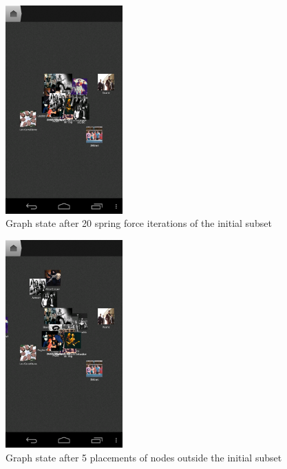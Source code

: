 \begin{figure}[H]
  \centering
    \includegraphics[width=0.4\textwidth]{figures/screen_mds_3_after_20_subset_iterations}
  \caption{Graph state after 20 spring force iterations of the initial subset}
\end{figure}

\begin{figure}[H]
  \centering
    \includegraphics[width=0.4\textwidth]{figures/screen_mds_4_after_5_restnode_additions}
  \caption{Graph state after 5 placements of nodes outside the initial subset}
\end{figure}

